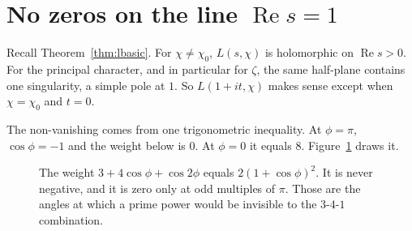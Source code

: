\section{No zeros on the line \texorpdfstring{$\operatorname{Re}s=1$}{Re s = 1}}

Recall Theorem~\ref{thm:lbasic}. For $\chi\ne\chi_0$, $L(s,\chi)$ is holomorphic on $\operatorname{Re}s>0$. For the principal character, and in particular for $\zeta$, the same half-plane contains one singularity, a simple pole at $1$. So $L(1+it,\chi)$ makes sense except when $\chi=\chi_0$ and $t=0$.

The non-vanishing comes from one trigonometric inequality. At $\phi=\pi$, $\cos\phi=-1$ and the weight below is $0$. At $\phi=0$ it equals $8$. Figure~\ref{fig:trigweight} draws it.

\begin{figure}[ht]
\centering
{}
\caption{The weight $3+4\cos\phi+\cos 2\phi$ equals $2(1+\cos\phi)^2$. It is never negative, and it is zero only at odd multiples of $\pi$. Those are the angles at which a prime power would be invisible to the $3$-$4$-$1$ combination.}
\label{fig:trigweight}
\end{figure}

